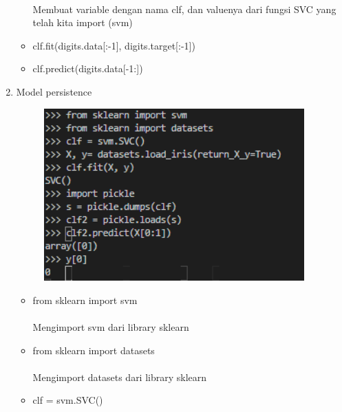 \documentclass{article}
\begin{document}
\begin{enumerate}
\begin{itemize}
                        \paragraph{}Membuat variable dengan nama clf, dan valuenya dari fungsi SVC yang telah kita import (svm)
                    \item clf.fit(digits.data[:-1], digits.target[:-1])
                    \item clf.predict(digits.data[-1:])
                \end{itemize}
            \item Model persistence
                \begin{figure}[ht]
                    \centerline{\includegraphics[width=10cm]{4.PNG}}
                \end{figure}
                \begin{itemize}
                    \item from sklearn import svm
                        \paragraph{}Mengimport svm dari library sklearn
                    \item from sklearn import datasets
                        \paragraph{}Mengimport datasets dari library sklearn
                    \item clf = svm.SVC()

\end{itemize}
\end{enumerate}
\end{document}
